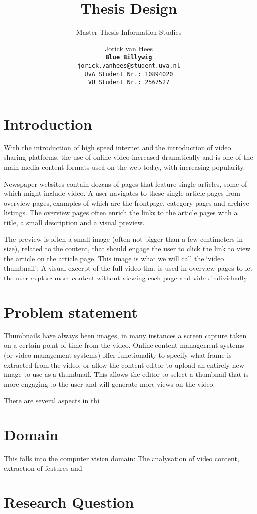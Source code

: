 \documentclass{acm_proc_article-sp}
\begin{document}
\title{Thesis Design}
\subtitle{Master Thesis Information Studies}

\author{
Jorick van Hees \\
\texttt{\textbf{Blue Billywig}} \\
\texttt{jorick.vanhees@student.uva.nl} \\
\texttt{UvA Student Nr.: 10894020} \\
\texttt{VU Student Nr.: 2567527}
}

\maketitle


\section{Introduction}

With the introduction of high speed internet and the introduction of video sharing platforms, the use of online video increased dramatically and is one of the main media content formats used on the web today, with increasing popularity.

Newspaper websites contain dozens of pages that feature single articles, some of which might include video. A user navigates to these single article pages from overview pages, examples of which are the frontpage, category pages and archive listings. The overview pages often enrich the links to the article pages with a title, a small description and a visual preview.

The preview is often a small image (often not bigger than a few centimeters in size), related to the content, that should engage the user to click the link to view the article on the article page. This image is what we will call the `video thumbnail': A visual excerpt of the full video that is used in overview pages to let the user explore more content without viewing each page and video individually.

\section{Problem statement}

Thumbnails have always been images, in many instances a screen capture taken on a certain point of time from the video. Online content management systems (or video management systems) offer functionality to specify what frame is extracted from the video, or allow the content editor to upload an entirely new image to use as a thumbnail. This allows the editor to select a thumbnail that is more engaging to the user and will generate more views on the video.

There are several aspects in thi


\section{Domain}

This falls into the computer vision domain: The analysation of video content, extraction of features and 

\section{Research Question}




\printbibliography

\balancecolumns
\end{document}
